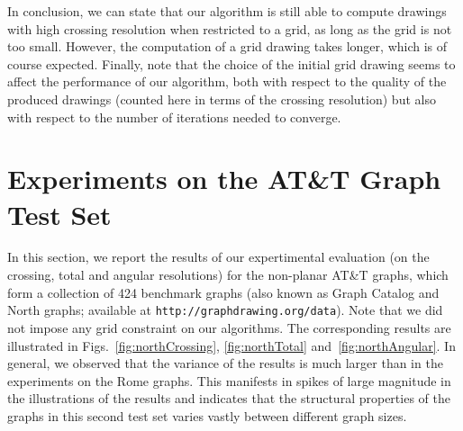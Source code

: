 \documentclass[runningheads]{llncs}
\begin{document}
{In conclusion, we can state that our algorithm is still able to compute drawings with high crossing resolution when restricted to a grid, as long as the grid is not too small. However, the computation of a grid drawing takes longer, which is of course expected.
Finally, note that the choice of the initial grid drawing seems to affect the performance of our algorithm, both with respect to the quality of the produced drawings (counted here in terms of the crossing resolution) but also with respect to the number of iterations needed to converge.

\section{Experiments on the AT\&T  Graph Test Set}
\label{app:north}

In this section, we report the results of our expertimental evaluation (on the crossing, total and angular resolutions) for the non-planar AT\&T graphs, which form a collection of 424 benchmark graphs (also known as Graph Catalog and North graphs; available at \texttt{http://graphdrawing.org/data}). Note that we did not impose any grid constraint on our algorithms. The corresponding results are illustrated in Figs.~\ref{fig:northCrossing}, \ref{fig:northTotal} and~\ref{fig:northAngular}. In general, we observed that the variance of the results is much larger than in the experiments on the Rome graphs. This manifests in spikes of large magnitude in the illustrations of the results and indicates that the structural properties of the graphs in this second test set varies vastly between different graph sizes.


}
\end{document}
